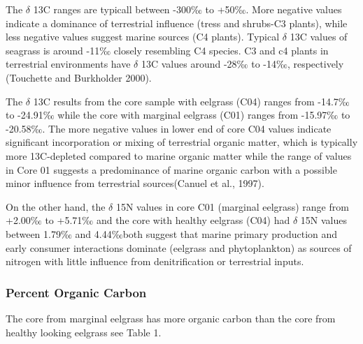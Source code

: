 \documentclass[
  12pt,
]{article}
\begin{document}
The \(\delta\) 13C ranges are typicall between -300‰ to +50‰. More
negative values indicate a dominance of terrestrial influence (tress and
shrubs-C3 plants), while less negative values suggest marine sources (C4
plants). Typical \(\delta\) 13C values of seagrass is around -11‰
closely resembling C4 species. C3 and c4 plants in terrestrial
environments have \(\delta\) 13C values around -28‰ to -14‰,
respectively (Touchette and Burkholder 2000).

The \(\delta\) 13C results from the core sample with eelgrass (C04)
ranges from -14.7‰ to -24.91‰ while the core with marginal eelgrass
(C01) ranges from -15.97‰ to -20.58‰. The more negative values in lower
end of core C04 values indicate significant incorporation or mixing of
terrestrial organic matter, which is typically more 13C-depleted
compared to marine organic matter while the range of values in Core 01
suggests a predominance of marine organic carbon with a possible minor
influence from terrestrial sources(Canuel et al., 1997).

On the other hand, the \(\delta\) 15N values in core C01 (marginal
eelgrass) range from +2.00‰ to +5.71‰ and the core with healthy eelgrass
(C04) had \(\delta\) 15N values between 1.79‰ and 4.44‰both suggest that
marine primary production and early consumer interactions dominate
(eelgrass and phytoplankton) as sources of nitrogen with little
influence from denitrification or terrestrial inputs.

\hypertarget{percent-organic-carbon}{%
\subsubsection{Percent Organic Carbon}\label{percent-organic-carbon}}

The core from marginal eelgrass has more organic carbon than the core
from healthy looking eelgrass see Table 1.
\end{document}
